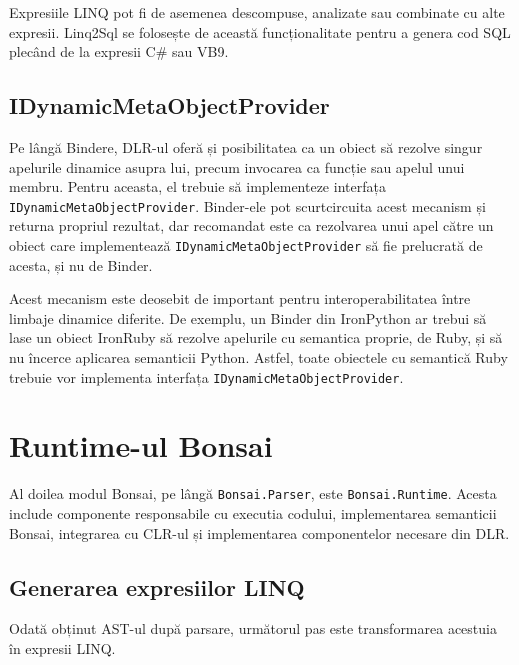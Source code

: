 \documentclass[12pt,a4paper]{memoir}
\renewcommand{\c}{\texttt}
\begin{document}
Expresiile LINQ pot fi de asemenea descompuse, analizate sau combinate cu alte expresii. Linq2Sql se folosește de această funcționalitate pentru a genera cod SQL plecând de la expresii C\# sau VB9.

\section{IDynamicMetaObjectProvider}\label{sec:IDynamicMetaObjectProvider}

Pe lângă Bindere, DLR-ul oferă și posibilitatea ca un obiect să rezolve singur apelurile dinamice asupra lui, precum invocarea ca funcție sau apelul unui membru. Pentru aceasta, el trebuie să implementeze interfața \\ \c{IDynamicMetaObjectProvider}\cite{i_dynamic_meta_object_provider}. Binder-ele pot scurtcircuita acest mecanism și returna propriul rezultat, dar recomandat este ca rezolvarea unui apel către un obiect care implementează \c{IDynamicMetaObjectProvider} să fie prelucrată de acesta, și nu de Binder.

Acest mecanism este deosebit de important pentru interoperabilitatea între limbaje dinamice diferite. De exemplu, un Binder din IronPython ar trebui să lase un obiect IronRuby să rezolve apelurile cu semantica proprie, de Ruby, și să nu încerce aplicarea semanticii Python. Astfel, toate obiectele cu semantică Ruby trebuie vor implementa interfața \c{IDynamicMetaObjectProvider}.

\chapter{Runtime-ul Bonsai}

Al doilea modul Bonsai, pe lângă \c{Bonsai.Parser}, este \c{Bonsai.Runtime}. Acesta include componente responsabile cu executia codului, implementarea semanticii Bonsai, integrarea cu CLR-ul și implementarea componentelor necesare din DLR.

\section{Generarea expresiilor LINQ}

Odată obținut AST-ul după parsare, următorul pas este transformarea acestuia în expresii LINQ\cite{linq_expressions}. 
\end{document}
